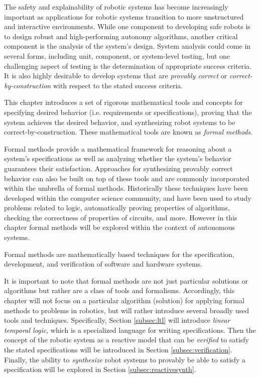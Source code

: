 The safety and explainability of robotic systems has become increasingly important as applications for robotic systems transition to more unstructured and interactive environments. While one component to developing safe robots is to design robust and high-performing autonomy algorithms, another critical component is the analysis of the system's design. System analysis could come in several forms, including unit, component, or system-level testing, but one challenging aspect of testing is the determination of appropriate success criteria. It is also highly desirable to develop systems that are \textit{provably correct} or \textit{correct-by-construction} with respect to the stated success criteria.

This chapter introduces a set of rigorous mathematical tools and concepts for specifying desired behavior (i.e. requirements or specifications), proving that the system achieves the desired behavior, and synthesizing robot systems to be correct-by-construction. These mathematical tools are known as \textit{formal methods}\cite{ClarkeGrumbergEtAl2018}.

Formal methods provide a mathematical framework for reasoning about a system's specifications as well as analyzing whether the system's behavior guarantees their satisfaction. Approaches for synthesizing provably correct behavior can also be built on top of these tools and are commonly incorporated within the umbrella of formal methods. Historically these techniques have been developed within the computer science community, and have been used to study problems related to logic, automatically proving properties of algorithms, checking the correctness of properties of circuits, and more. However in this chapter formal methods will be explored within the context of autonomous systems.

\begin{definition}
Formal methods are mathematically based techniques for the specification, development, and verification of software and hardware systems.
\end{definition}

It is important to note that formal methods are not just particular solutions or algorithms but rather are a class of tools and formalisms. Accordingly, this chapter will not focus on a particular algorithm (solution) for applying formal methods to problems in robotics, but will rather introduce several broadly used tools and techniques. Specifically, Section \ref{subsec:ltl} will introduce \textit{linear temporal logic}, which is a specialized language for writing specifications. Then the concept of the robotic system as a reactive model that can be \textit{verified} to satisfy the stated specifications will be introduced in Section \ref{subsec:verification}. Finally, the ability to \textit{synthesize} robot systems to provably be able to satisfy a specification will be explored in Section \ref{subsec:reactivesynth}.

